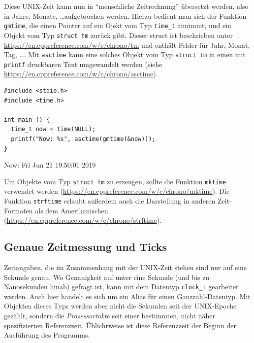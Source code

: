 Diese UNIX-Zeit kann nun in \enquote{menschliche Zeitrechnung} übersetzt werden, also in Jahre, Monate, \ldots aufgebrochen werden. Hierzu bedient man sich der Funktion \texttt{gmtime}, die einen Pointer auf ein Ojekt vom Typ \texttt{time_t} annimmt, und ein Objekt vom Typ \texttt{struct tm} zurück gibt. Dieser struct ist beschrieben unter \url{https://en.cppreference.com/w/c/chrono/tm} und enthält Felder für Jahr, Monat, Tag, \ldots. Mit \texttt{asctime} kann eine solches Objekt vom Typ 
\texttt{struct tm} in einen mit \texttt{printf} druckbaren Text umgewandelt werden (siehe \url{https://en.cppreference.com/w/c/chrono/asctime}).

\begin{codebox}
\begin{verbatim}
#include <stdio.h>
#include <time.h>

int main () {
  time_t now = time(NULL);
  printf("Now: %s", asctime(gmtime(&now)));
}
\end{verbatim}
\end{codebox}

\begin{cmdbox}
Now: Fri Jun 21 19:50:01 2019
\end{cmdbox}

Um Objekte vom Typ \texttt{struct tm} zu erzeugen, sollte die Funktion \texttt{mktime} verwendet werden (\url{https://en.cppreference.com/w/c/chrono/mktime}). Die Funktion \texttt{strftime} erlaubt außerdem auch die Darstellung in anderen Zeit-Formaten als dem Amerikanischen (\url{https://en.cppreference.com/w/c/chrono/strftime}).

\subsection{Genaue Zeitmessung und Ticks}
Zeitangaben, die im Zusammenhang mit der UNIX-Zeit stehen sind nur auf eine Sekunde genau. Wo Genauigkeit auf unter eine Sekunde (und bis zu Nanosekunden hinab) gefragt ist, kann mit dem Datentyp \texttt{clock_t} gearbeitet werden. Auch hier handelt es sich um ein Alias für einen Ganzzahl-Datentyp. Mit Objekten dieses Typs werden aber nicht die Sekunden seit der UNIX-Epoche gezählt, sondern die \emph{Prozessortakte} seit einer bestimmten, nicht näher spezifizierten Referenzzeit. Üblichrweise ist diese Referenzzeit der Beginn der Ausführung des Programms.

